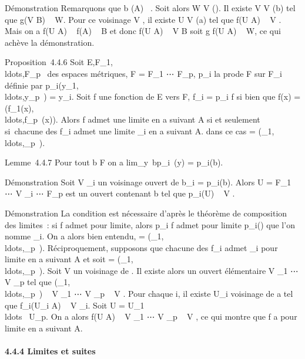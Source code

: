 \documentclass[]{article}
\begin{document}
Démonstration Remarquons que b \in\overlinef(A)
\subset~\overlineB. Soit alors W \in V (\ell). Il existe V \in V
(b) tel que g(V \bigcap B) \subset~ W. Pour ce voisinage V , il existe U \in V (a) tel
que f(U \bigcap A) \subset~ V . Mais on a f(U \bigcap A) \subset~ f(A) \subset~ B et donc f(U \bigcap A) \subset~ V \bigcap
B soit g \cdot f(U \bigcap A) \subset~ W, ce qui achève la démonstration.

Proposition~4.4.6 Soit
E,F\_1,\\ldots,F\_p~
des espaces métriques, F = F\_1 \times⋯ \times
F\_p, p\_i la pro\jmathection de F sur F\_i définie
par
p\_i(y\_1,\\ldots,y\_p~)
= y\_i. Soit f une fonction de E vers F, f\_i =
p\_i \cdot f si bien que f(x) =
(f\_1(x),\\ldots,f\_p~(x)).
Alors f admet une limite \ell en a suivant A si et seulement si~chacune des
f\_i admet une limite \ell\_i en a suivant A. dans ce cas \ell
=
(\ell\_1,\\ldots,\ell\_p~).

Lemme~4.4.7 Pour tout b \in F on a
lim\_y\rightarrow~bp\_i~(y) =
p\_i(b).

Démonstration Soit V \_i un voisinage ouvert de b\_i =
p\_i(b). Alors U = F\_1 \times⋯ \times
V \_i \times⋯ \times F\_p est un ouvert
contenant b tel que p\_i(U) \subset~ V .

Démonstration La condition est nécessaire d'après le théorème de
composition des limites~: si f admet \ell pour limite, alors p\_i \cdot
f admet pour limite p\_i(\ell) que l'on nomme \ell\_i. On a
alors bien entendu, \ell =
(\ell\_1,\\ldots,\ell\_p~).
Réciproquement, supposons que chacune des f\_i admet
\ell\_i pour limite en a suivant A et soit \ell =
(\ell\_1,\\ldots,\ell\_p~).
Soit V un voisinage de \ell. Il existe alors un ouvert élémentaire V
\_1 \times⋯ \times V \_p tel que
(\ell\_1,\\ldots,\ell\_p~)
\subset~ V \_1 \times⋯ \times V \_p \subset~ V . Pour
chaque i, il existe U\_i voisinage de a tel que
f\_i(U\_i \bigcap A) \subset~ V \_i. Soit U = U\_1
\bigcap\\ldots~ \bigcap
U\_p. On a alors f(U \bigcap A) \subset~ V \_1
\times⋯ \times V \_p \subset~ V , ce qui montre que f
a \ell pour limite en a suivant A.

\paragraph{4.4.4 Limites et suites}
\end{document}
